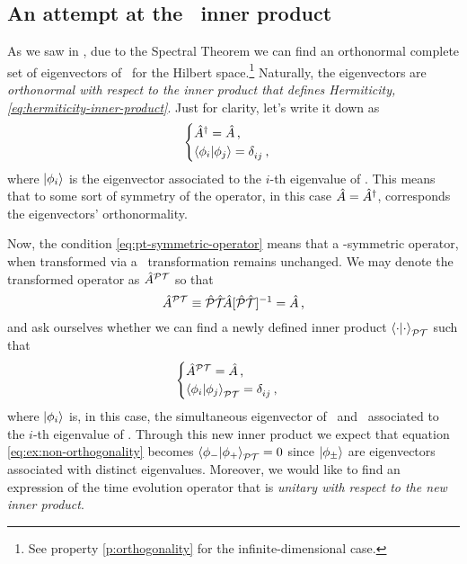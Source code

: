         \subsection{An attempt at the \PT\ inner product}
            As we saw in , due to the Spectral Theorem we can find an orthonormal complete set of eigenvectors of \hA\ for the Hilbert space.\footnote{See property \ref{p:orthogonality} for the infinite-dimensional case.} Naturally, the eigenvectors are \emph{orthonormal with respect to the inner product that defines Hermiticity, \eqref{eq:hermiticity-inner-product}}. Just for clarity, let's write it down as
            \begin{equation*}
                \begin{cases}
                    \hA^\dag = \hA
                    \mycomma \\
                    \braket{\phi_i}{\phi_j} = \tensor{\delta}{_i_j}
                    \mycomma
                \end{cases}
            \end{equation*}
            where $\ket{\phi_i}$ is the eigenvector associated to the $i$-th eigenvalue of \hA. This means that to some sort of symmetry of the operator, in this case $\hat{A} = \hat{A}^\dag$, corresponds the eigenvectors' orthonormality.

            Now, the condition \eqref{eq:pt-symmetric-operator} means that a \PT-symmetric operator, when transformed via a \PT\ transformation remains unchanged. We may denote the transformed operator as $\hat{A}^{\mathcal{P}\mathcal{T}}$ so that
            \begin{equation*}
                \hA^{\PT} \equiv \PTtransform{\hA} = \hA
                \mycomma
            \end{equation*}
            and ask ourselves whether we can find a newly defined inner product $\braket{\cdot}{\cdot}_{\mathcal{P}\mathcal{T}}$ such that
            \begin{equation*}
                \begin{cases}
                    \hA^{\PT} = \hA
                    \mycomma \\
                    \braket{\phi_i}{\phi_j}_{\PT} = \tensor{\delta}{_i_j}
                    \mycomma
                \end{cases}
            \end{equation*}
            where $\ket{\phi_i}$ is, in this case, the simultaneous eigenvector of \hA\ and \hPT\ associated to the $i$-th eigenvalue of \hA. Through this new inner product we expect that equation \eqref{eq:ex:non-orthogonality} becomes $\braket{\phi_-}{\phi_+}_{\mathcal{P}\mathcal{T}} = 0$ since $\ket{\phi_\pm}$ are eigenvectors associated with distinct eigenvalues. Moreover, we would like to find an expression of the time evolution operator that is \emph{unitary with respect to the new inner product}.

